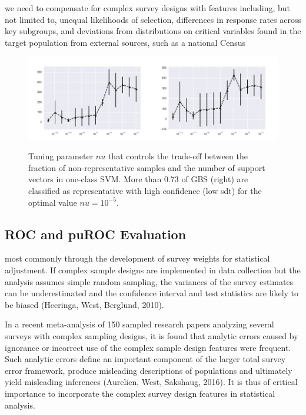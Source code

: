 we need to compensate for complex survey designs with features including, but not limited to, unequal likelihoods of selection, differences in response rates across key subgroups, and deviations from distributions on critical variables found in the target population from external sources, such as a national Census

\begin{figure}[ht]
	\begin{center}
		\includegraphics[scale=0.55,angle=0]{fig/occfigure}
		\label{occ}
		\vspace*{-1.0cm}
		\caption{Tuning parameter \(nu\) that controls the trade-off between the fraction of non-representative samples and the number of support vectors in one-class SVM. More than 0.73 of GBS (right) are classified as representative with high confidence (low sdt) for the optimal value \(nu = 10^{-5}\).}
	\end{center}
\end{figure}

\subsection{ROC and puROC Evaluation}

most commonly through the development of survey weights for statistical adjustment. If complex sample designs are implemented in data collection but the analysis assumes simple random sampling, the variances of the survey estimates can be underestimated and the confidence interval and test statistics are likely to be biased (Heeringa, West,  Berglund, 2010).

In a recent meta-analysis of 150 sampled research papers analyzing several surveys with complex sampling designs, it is found that analytic errors caused by ignorance or incorrect use of the complex sample design features were frequent. Such analytic errors define an important component of the larger total survey error framework, produce misleading descriptions of populations and ultimately yield misleading inferences (Aurelien, West,  Sakshaug, 2016). It is thus of critical importance to incorporate the complex survey design features in statistical analysis. 


